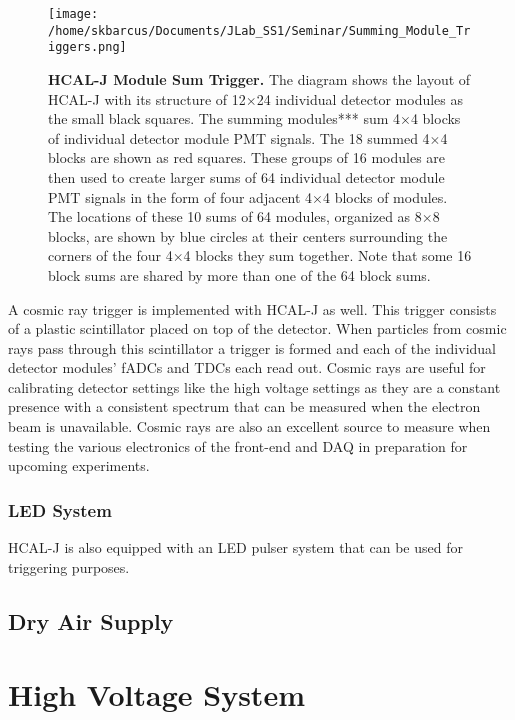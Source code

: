 \documentclass[review]{elsarticle}
\newcommand{\hcal}{HCAL-J }
\begin{document}
 	\begin{figure}[!ht]
	\begin{center}
	\texttt{[image: /home/skbarcus/Documents/JLab\_SS1/Seminar/Summing\_Module\_Triggers.png]}
	\end{center}
	\caption{
	{\bf{\hcal Module Sum Trigger.}} The diagram shows the layout of \hcal with its structure of 12$\times$24 individual detector modules as the small black squares. The summing modules*** sum 4$\times$4 blocks of individual detector module PMT signals. The 18 summed 4$\times$4 blocks are shown as red squares. These groups of 16 modules are then used to create larger sums of 64 individual detector module PMT signals in the form of four adjacent 4$\times$4 blocks of modules. The locations of these 10 sums of 64 modules, organized as 8$\times$8 blocks, are shown by blue circles at their centers surrounding the corners of the four 4$\times$4 blocks they sum together. Note that some 16 block sums are shared by more than one of the 64 block sums.}
	\label{fig:sum_trigger}
	\end{figure}	

A cosmic ray trigger is implemented with \hcal as well. This trigger consists of a plastic scintillator placed on top of the detector. When particles from cosmic rays pass through this scintillator a trigger is formed and each of the individual detector modules' fADCs and TDCs each read out. Cosmic rays are useful for calibrating detector settings like the high voltage settings as they are a constant presence with a consistent spectrum that can be measured when the electron beam is unavailable. Cosmic rays are also an excellent source to measure when testing the various electronics of the front-end and DAQ in preparation for upcoming experiments.

\subsubsection{LED System}
\label{leds}

\hcal is also equipped with an LED pulser system that can be used for triggering purposes. 

\subsection{Dry Air Supply}
\label{dry_air}

\section{High Voltage System}
\label{hv}
\end{document}
